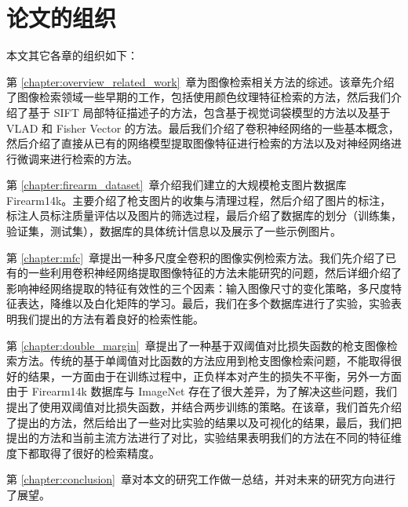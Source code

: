 \section{论文的组织}
本文其它各章的组织如下：

第 \ref{chapter:overview_related_work}~章为图像检索相关方法的综述。该章先介绍了图像检索领域一些早期的工作，包括使用颜色纹理特征检索的方法，然后我们介绍了基于 SIFT 局部特征描述子的方法，包含基于视觉词袋模型的方法以及基于 VLAD 和 Fisher Vector 的方法。最后我们介绍了卷积神经网络的一些基本概念，然后介绍了直接从已有的网络模型提取图像特征进行检索的方法以及对神经网络进行微调来进行检索的方法。

第 \ref{chapter:firearm_dataset}~章介绍我们建立的大规模枪支图片数据库 Firearm14k。主要介绍了枪支图片的收集与清理过程，然后介绍了图片的标注，标注人员标注质量评估以及图片的筛选过程，最后介绍了数据库的划分（训练集，验证集，测试集），数据库的具体统计信息以及展示了一些示例图片。

第 \ref{chapter:mfc}~章提出一种多尺度全卷积的图像实例检索方法。我们先介绍了已有的一些利用卷积神经网络提取图像特征的方法未能研究的问题，然后详细介绍了影响神经网络提取的特征有效性的三个因素：输入图像尺寸的变化策略，多尺度特征表达，降维以及白化矩阵的学习。最后，我们在多个数据库进行了实验，实验表明我们提出的方法有着良好的检索性能。

第 \ref{chapter:double_margin}~章提出了一种基于双阈值对比损失函数的枪支图像检索方法。传统的基于单阈值对比函数的方法应用到枪支图像检索问题，不能取得很好的结果，一方面由于在训练过程中，正负样本对产生的损失不平衡，另外一方面由于 Firearm14k 数据库与 ImageNet 存在了很大差异，为了解决这些问题，我们提出了使用双阈值对比损失函数，并结合两步训练的策略。在该章，我们首先介绍了提出的方法，然后给出了一些对比实验的结果以及可视化的结果，最后，我们把提出的方法和当前主流方法进行了对比，实验结果表明我们的方法在不同的特征维度下都取得了很好的检索精度。

第 \ref{chapter:conclusion}~章对本文的研究工作做一总结，并对未来的研究方向进行了展望。
